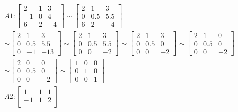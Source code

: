 \begin{gather*}
    A1: \begin{bmatrix}
        2 & 1 & 3 \\
        -1 & 0 & 4 \\
        6 & 2 & -4 
        \end{bmatrix}
        \sim
        \begin{bmatrix}
        2 & 1 & 3 \\
        0 & 0.5 & 5.5 \\
        6 & 2 & -4 
        \end{bmatrix}
        \\
        \sim
        \begin{bmatrix}
        2 & 1 & 3 \\
        0 & 0.5 & 5.5 \\
        0 & -1 & -13 
        \end{bmatrix}
        \sim
        \begin{bmatrix}
        2 & 1 & 3 \\
        0 & 0.5 & 5.5 \\
        0 & 0 & -2 
        \end{bmatrix}
        \sim
        \begin{bmatrix}
        2 & 1 & 3 \\
        0 & 0.5 & 0 \\
        0 & 0 & -2 
        \end{bmatrix}
        \sim
        \begin{bmatrix}
        2 & 1 & 0 \\
        0 & 0.5 & 0 \\
        0 & 0 & -2 
        \end{bmatrix}
        \\
        \sim
        \begin{bmatrix}
        2 & 0 & 0 \\
        0 & 0.5 & 0 \\
        0 & 0 & -2 
        \end{bmatrix}
        \sim
        \begin{bmatrix}
        1 & 0 & 0 \\
        0 & 1 & 0 \\
        0 & 0 & 1 
        \end{bmatrix}
    \\ A2: \begin{bmatrix}
        1 & 1 & 1 \\
        -1 & 1 & 2 \\

\end{bmatrix}
\end{gather*}
